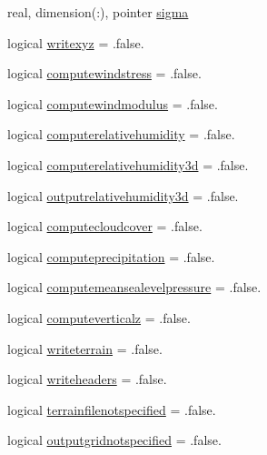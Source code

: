 \begin{DoxyCompactItemize}
\item 
real, dimension(\+:), pointer \mbox{\hyperlink{structmodulemm5format_1_1t__mm5format_a8025f7b06f5a808aa8653ac321290300}{sigma}}
\item 
logical \mbox{\hyperlink{structmodulemm5format_1_1t__mm5format_a64290918df8cb6f59dbd0c075e690cc6}{writexyz}} = .false.
\item 
logical \mbox{\hyperlink{structmodulemm5format_1_1t__mm5format_a6ef3941dd16c10513ae77658bfabd634}{computewindstress}} = .false.
\item 
logical \mbox{\hyperlink{structmodulemm5format_1_1t__mm5format_a8e9b5d6040231a7ab74d565c16caf76f}{computewindmodulus}} = .false.
\item 
logical \mbox{\hyperlink{structmodulemm5format_1_1t__mm5format_acdc39e7dfd4c2b4998983442320b6637}{computerelativehumidity}} = .false.
\item 
logical \mbox{\hyperlink{structmodulemm5format_1_1t__mm5format_acbe46e52ab0e2cf5d346f57f9cc24144}{computerelativehumidity3d}} = .false.
\item 
logical \mbox{\hyperlink{structmodulemm5format_1_1t__mm5format_a439f474b94c6353c22ad1e18ba4e3a30}{outputrelativehumidity3d}} = .false.
\item 
logical \mbox{\hyperlink{structmodulemm5format_1_1t__mm5format_a3096b67bedfcdc66c7593c6fda550baf}{computecloudcover}} = .false.
\item 
logical \mbox{\hyperlink{structmodulemm5format_1_1t__mm5format_ab2c4044c6da9b323784b37b045d2646a}{computeprecipitation}} = .false.
\item 
logical \mbox{\hyperlink{structmodulemm5format_1_1t__mm5format_a903cc99162925cc07d7ae8b60f65567f}{computemeansealevelpressure}} = .false.
\item 
logical \mbox{\hyperlink{structmodulemm5format_1_1t__mm5format_a0c386a732a3f9128b9f2755f98567818}{computeverticalz}} = .false.
\item 
logical \mbox{\hyperlink{structmodulemm5format_1_1t__mm5format_a529dad13fec89d00c3a47a38da18d246}{writeterrain}} = .false.
\item 
logical \mbox{\hyperlink{structmodulemm5format_1_1t__mm5format_a65d30ff421a769d8df2cfeec14729ba9}{writeheaders}} = .false.
\item 
logical \mbox{\hyperlink{structmodulemm5format_1_1t__mm5format_a48c02ce4a5282a64dd5c5d422e394654}{terrainfilenotspecified}} = .false.
\item 
logical \mbox{\hyperlink{structmodulemm5format_1_1t__mm5format_aa4e49af3f707c4ecda4c0e7b28d7516d}{outputgridnotspecified}} = .false.

\end{DoxyCompactItemize}
